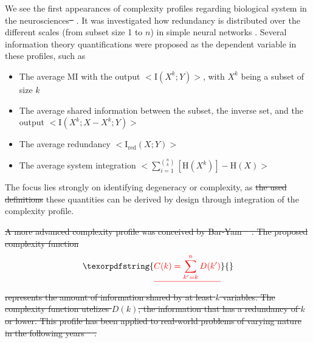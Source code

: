 \documentclass{article}
\providecommand{\DIFaddtex}[1]{{\protect\color{blue}\uwave{#1}}} %
\providecommand{\DIFdeltex}[1]{{\protect\color{red}\sout{#1}}}                      %
\providecommand{\DIFaddbegin}{} %
\providecommand{\DIFaddend}{} %
\providecommand{\DIFdelbegin}{} %
\providecommand{\DIFdelend}{} %
\providecommand{\DIFadd}[1]{\texorpdfstring{\DIFaddtex{#1}}{#1}} %
\providecommand{\DIFdel}[1]{\texorpdfstring{\DIFdeltex{#1}}{}} %
\begin{document}
We see the first appearances of complexity profiles regarding biological system in the neurosciences\DIFdelbegin \DIFdel{\mbox{%
\cite{}}%
}\DIFdelend .
It was investigated how redundancy is distributed over the different scales (from subset size 1 to $n$) in simple neural networks \cite{tononi1999measures}.
Several information theory quantifications were proposed as the dependent variable in these profiles, such as
%
 \begin{itemize} 
\item The average MI with the output \DIFdelbegin \DIFdel{$<\mathrm{I}(X^k;Y)>$}\DIFdelend \DIFaddbegin \DIFadd{$<\mathrm{I}\left( X^k;Y \right) >$}\DIFaddend , with $X^k$ being a subset of size $k$
\item The average shared information between the subset, the inverse set, and the output  \DIFdelbegin \DIFdel{$<\mathrm{I}(X^k;X - X^k;Y)>$
}\DIFdelend \DIFaddbegin \DIFadd{$<\mathrm{I}\left( X^k;X - X^k;Y\right) >$
}\DIFaddend \item The average redundancy \DIFdelbegin \DIFdel{$<\mathrm{I}_\mathrm{red}(X;Y)>$
}\DIFdelend \DIFaddbegin \DIFadd{$<\mathrm{I}_\mathrm{red}\left( X;Y\right) >$
}\DIFaddend \item The average system integration \DIFdelbegin \DIFdel{$<\sum_{i = 1}^{\binom{n}{k}}[\mathrm{H}(X^k)] - \mathrm{H}(X)>$
}\DIFdelend \DIFaddbegin \DIFadd{$<\sum_{i = 1}^{\binom{n}{k}}[\mathrm{H}(X^k)] - \mathrm{H}\left( X\right) >$
}\DIFaddend  \end{itemize} 
%
The focus lies strongly on identifying degeneracy or complexity, as \DIFdelbegin \DIFdel{the used definitions }\DIFdelend these quantities can be derived by design through integration of the complexity profile.

\DIFdelbegin \DIFdel{A more advanced complexity profile was conceived by Bar-Yam \mbox{%
\cite{bar2004multiscale}}%
.
The proposed complexity function
}\begin{displaymath}
\DIFdel{C(k) = \sum_{k^\prime = k}^n D(k^\prime)
}\end{displaymath}
\DIFdel{represents the amount of information shared by at least $k$ variables.
The complexity function utelizes $D(k)$, the information that has a redundancy of $k$ or lower.
This profile has been applied to real-world problems of varying nature in the following years \mbox{%
\cite{bar2013computationally}}%
.
}%
\end{document}
